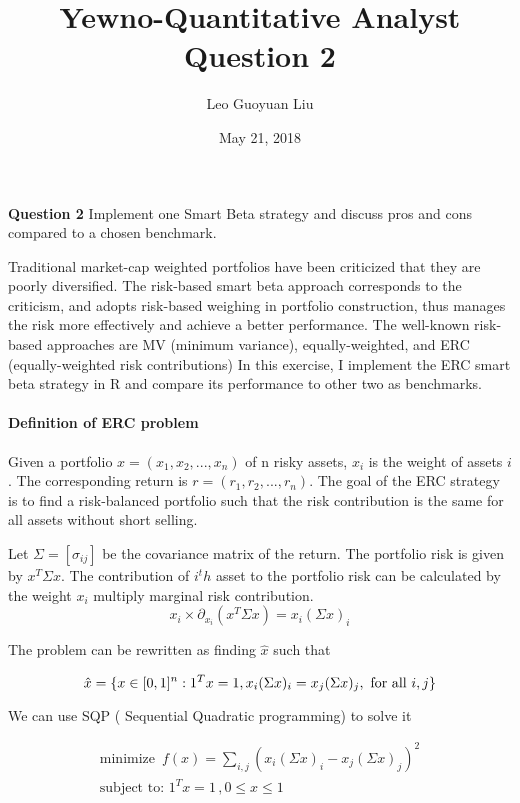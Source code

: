 \documentclass[]{article}
\title{Yewno-Quantitative Analyst Question 2}
\author{Leo Guoyuan Liu}
\date{May 21, 2018}
\let\oldparagraph\paragraph
\renewcommand{\paragraph}[1]{\oldparagraph{#1}\mbox{}}
\begin{document}
\maketitle

\textbf{Question 2} Implement one Smart Beta strategy and discuss pros
and cons compared to a chosen benchmark.

Traditional market-cap weighted portfolios have been criticized that
they are poorly diversified. The risk-based smart beta approach
corresponds to the criticism, and adopts risk-based weighing in
portfolio construction, thus manages the risk more effectively and
achieve a better performance. The well-known risk-based approaches are
MV (minimum variance), equally-weighted, and ERC (equally-weighted risk
contributions) In this exercise, I implement the ERC smart beta strategy
in R and compare its performance to other two as benchmarks.

\paragraph{Definition of ERC problem}\label{definition-of-erc-problem}

Given a portfolio \(x=(x_1,x_2,...,x_n)\) of n risky assets, \(x_i\) is
the weight of assets \(i\). The corresponding return is
\(r=(r_1,r_2,...,r_n)\). The goal of the ERC strategy is to find a
risk-balanced portfolio such that the risk contribution is the same for
all assets without short selling.

Let \(\Sigma=[\sigma_{ij}]\) be the covariance matrix of the return. The
portfolio risk is given by \(x^T \Sigma x\). The contribution of
\(i^th\) asset to the portfolio risk can be calculated by the weight
\(x_i\) multiply marginal risk contribution.
\[x_i\times \partial_{x_i} (x^T\Sigma x)=x_i (\Sigma x)_i \]

The problem can be rewritten as finding \(\hat{x}\) such that

\[\hat{x}=\{ x\in [0,1]^n:1^T x=1,x_i(\Sigma x)_i= x_j(\Sigma x)_j, \\
\text{ for all } i,j\} \]

We can use SQP ( Sequential Quadratic programming) to solve it

\[\begin{equation}
\begin{split}
\text{minimize } \,\displaystyle f(x)=\sum_{i,j}(x_i(\Sigma x)_i - x_j(\Sigma x)_j )^2\\
\text{subject to: } \displaystyle 1^Tx=1 \,, 0\le x\le1
\end{split}
\end{equation}\]
\end{document}
